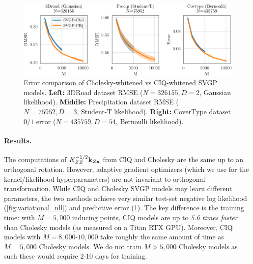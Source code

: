 \begin{figure}[t!]
  \centering
  \includegraphics[width=\linewidth]{figures/variational_error.pdf}
  \caption[Error comparison of Cholesky-whitened vs CIQ-whitened SVGP models.]{
    Error comparison of Cholesky-whitened vs CIQ-whitened SVGP models.
    {\bf Left:} 3DRoad dataset RMSE ($N=326155, D=2$, Gaussian likelihood).
    {\bf Middle:} Precipitation dataset RMSE ($N=75952, D=3$, Student-T likelihood).
    {\bf Right:} CoverType dataset $0/1$ error ($N=435759, D=54$, Bernoulli likelihood).
  }
  \label{fig:variational_error}
\end{figure}

\paragraph{Results.}
The computations of $K_{ZZ}^{-1/2} \mathbf{k}_{Z\mathbf{x}}$ from CIQ and Cholesky are the same up to an orthogonal rotation.
However, adaptive gradient optimizers (which we use for the kernel/likelihood hyperparameters) are not invariant to orthogonal transformation.
While CIQ and Cholesky SVGP models may learn different parameters, the two methods achieve very similar test-set negative log likelihood (\cref{fig:variational_nll}) and predictive error (\cref{fig:variational_error}).
The key difference is the training time:
with $M=5,\!000$ inducing points, CIQ models are up to \emph{5.6 times faster} than Cholesky models (as measured on a Titan RTX GPU).
Moreover, CIQ models with $M=8,\!000$-$10,\!000$ take roughly the same amount of time as $M=5,\!000$ Cholesky models.
We do not train $M > 5,\!000$ Cholesky models as such these would require $2$-$10$ days for training.

